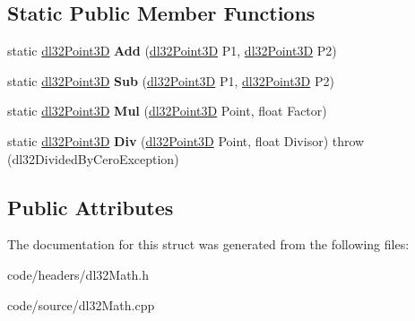 \subsection*{Static Public Member Functions}
\begin{DoxyCompactItemize}
\item 
\hypertarget{structdl32_point3_d_aab30c2208be3ead01d43cf82fc2bb859}{static \hyperlink{structdl32_point3_d}{dl32\-Point3\-D} {\bfseries Add} (\hyperlink{structdl32_point3_d}{dl32\-Point3\-D} P1, \hyperlink{structdl32_point3_d}{dl32\-Point3\-D} P2)}\label{structdl32_point3_d_aab30c2208be3ead01d43cf82fc2bb859}

\item 
\hypertarget{structdl32_point3_d_a5fd6e0d8fc64c427f143441cfcbc6cdb}{static \hyperlink{structdl32_point3_d}{dl32\-Point3\-D} {\bfseries Sub} (\hyperlink{structdl32_point3_d}{dl32\-Point3\-D} P1, \hyperlink{structdl32_point3_d}{dl32\-Point3\-D} P2)}\label{structdl32_point3_d_a5fd6e0d8fc64c427f143441cfcbc6cdb}

\item 
\hypertarget{structdl32_point3_d_a7713506b6abff736be4096189bc53bd3}{static \hyperlink{structdl32_point3_d}{dl32\-Point3\-D} {\bfseries Mul} (\hyperlink{structdl32_point3_d}{dl32\-Point3\-D} Point, float Factor)}\label{structdl32_point3_d_a7713506b6abff736be4096189bc53bd3}

\item 
\hypertarget{structdl32_point3_d_ae189e59e5acd5e8bfeed8338bedaa687}{static \hyperlink{structdl32_point3_d}{dl32\-Point3\-D} {\bfseries Div} (\hyperlink{structdl32_point3_d}{dl32\-Point3\-D} Point, float Divisor)  throw (dl32\-Divided\-By\-Cero\-Exception)}\label{structdl32_point3_d_ae189e59e5acd5e8bfeed8338bedaa687}

\end{DoxyCompactItemize}
\subsection*{Public Attributes}


The documentation for this struct was generated from the following files\-:\begin{DoxyCompactItemize}
\item 
code/headers/dl32\-Math.\-h\item 
code/source/dl32\-Math.\-cpp\end{DoxyCompactItemize}
